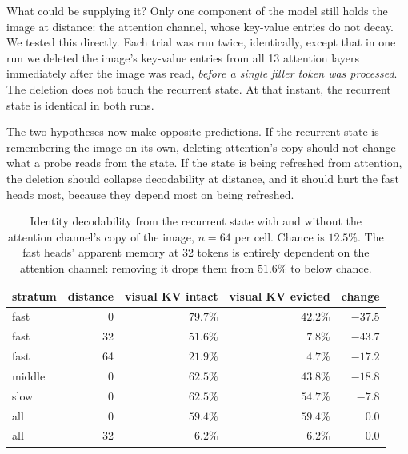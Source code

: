 \documentclass{article}
\begin{document}
What could be supplying it? Only one component of the model still holds the
image at distance: the attention channel, whose key-value entries do not decay.
We tested this directly. Each trial was run twice, identically, except that in
one run we deleted the image's key-value entries from all 13 attention layers
immediately after the image was read, \emph{before a single filler token was
processed}. The deletion does not touch the recurrent state. At that instant,
the recurrent state is identical in both runs.

The two hypotheses now make opposite predictions. If the recurrent state is
remembering the image on its own, deleting attention's copy should not change
what a probe reads from the state. If the state is being refreshed from
attention, the deletion should collapse decodability at distance, and it
should hurt the fast heads most, because they depend most on being refreshed.

\begin{table}[h]
\centering\small
\begin{tabular}{lrrrr}
\toprule
stratum & distance & visual KV intact & visual KV evicted & change \\
\midrule
fast   & 0  & $79.7\%$ & $42.2\%$ & $-37.5$ \\
fast   & 32 & $51.6\%$ & $\mathbf{7.8\%}$  & $-43.7$ \\
fast   & 64 & $21.9\%$ & $4.7\%$  & $-17.2$ \\
\addlinespace
middle & 0  & $62.5\%$ & $43.8\%$ & $-18.8$ \\
slow   & 0  & $62.5\%$ & $54.7\%$ & $-7.8$  \\
\addlinespace
all    & 0  & $59.4\%$ & $59.4\%$ & $0.0$   \\
all    & 32 & $6.2\%$  & $6.2\%$  & $0.0$   \\
\bottomrule
\end{tabular}
\caption{Identity decodability from the recurrent state with and without the
attention channel's copy of the image, $n = 64$ per cell. Chance is $12.5\%$.
The fast heads' apparent memory at 32 tokens is entirely dependent on the
attention channel: removing it drops them from $51.6\%$ to below chance.}
\label{tab:relay}
\end{table}
\end{document}
